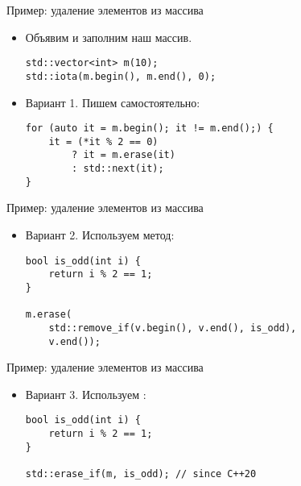 \documentclass{beamer}
\begin{document}
\begin{frame}[fragile]{Пример: удаление элементов из массива}
    \begin{itemize}
        \item Объявим и заполним наш массив.
            \begin{lstlisting}
std::vector<int> m(10);
std::iota(m.begin(), m.end(), 0);
            \end{lstlisting}
        \item Вариант 1. Пишем самостоятельно:
            \begin{lstlisting}
for (auto it = m.begin(); it != m.end();) {
    it = (*it % 2 == 0)
        ? it = m.erase(it)
        : std::next(it);
}
            \end{lstlisting}
    \end{itemize}
\end{frame}

\begin{frame}[fragile]{Пример: удаление элементов из массива}
    \begin{itemize}
        \item Вариант 2. Используем метод:
            \begin{lstlisting}
bool is_odd(int i) {
    return i % 2 == 1;
}

m.erase(
    std::remove_if(v.begin(), v.end(), is_odd),
    v.end());
            \end{lstlisting}
    \end{itemize}
\end{frame}

\begin{frame}[fragile]{Пример: удаление элементов из массива}
    \begin{itemize}
        \item Вариант 3. Используем :
            \begin{lstlisting}
bool is_odd(int i) {
    return i % 2 == 1;
}

std::erase_if(m, is_odd); // since C++20
            \end{lstlisting}
    \end{itemize}
\end{frame}
\end{document}
